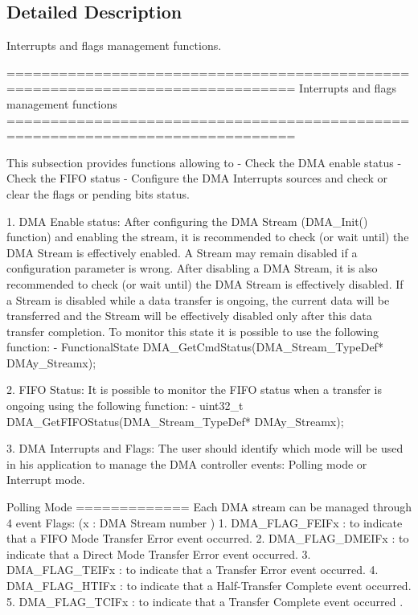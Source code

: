 \subsection{Detailed Description}
Interrupts and flags management functions. \begin{DoxyVerb} ===============================================================================
                  Interrupts and flags management functions
 ===============================================================================  

  This subsection provides functions allowing to
   - Check the DMA enable status
   - Check the FIFO status 
   - Configure the DMA Interrupts sources and check or clear the flags or pending bits status.   
   
 1. DMA Enable status:
   After configuring the DMA Stream (DMA_Init() function) and enabling the stream,
   it is recommended to check (or wait until) the DMA Stream is effectively enabled.
   A Stream may remain disabled if a configuration parameter is wrong.
   After disabling a DMA Stream, it is also recommended to check (or wait until) the DMA
   Stream is effectively disabled. If a Stream is disabled while a data transfer is ongoing, 
   the current data will be transferred and the Stream will be effectively disabled only after
   this data transfer completion.
   To monitor this state it is possible to use the following function:
     - FunctionalState DMA_GetCmdStatus(DMA_Stream_TypeDef* DMAy_Streamx); 
 
 2. FIFO Status:
   It is possible to monitor the FIFO status when a transfer is ongoing using the following 
   function:
     - uint32_t DMA_GetFIFOStatus(DMA_Stream_TypeDef* DMAy_Streamx); 
 
 3. DMA Interrupts and Flags:
  The user should identify which mode will be used in his application to manage the
  DMA controller events: Polling mode or Interrupt mode. 
    
  Polling Mode
  =============
    Each DMA stream can be managed through 4 event Flags:
    (x : DMA Stream number )
       1. DMA_FLAG_FEIFx  : to indicate that a FIFO Mode Transfer Error event occurred.
       2. DMA_FLAG_DMEIFx : to indicate that a Direct Mode Transfer Error event occurred.
       3. DMA_FLAG_TEIFx  : to indicate that a Transfer Error event occurred.
       4. DMA_FLAG_HTIFx  : to indicate that a Half-Transfer Complete event occurred.
       5. DMA_FLAG_TCIFx  : to indicate that a Transfer Complete event occurred .       


\end{DoxyVerb}
